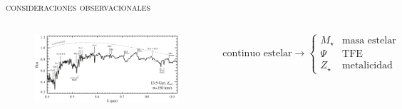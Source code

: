 \documentclass[xcolor=dvipsnames,4pt,fleqn,hyperref={colorlinks,citecolor=black,linkcolor=black,urlcolor=black}]{beamer}
\begin{document}
\begin{frame}{\textsc{consideraciones observacionales}}

\begin{columns}


\begin{figure}
\includegraphics[scale=0.33]{img/conroy2014-1}
\end{figure}

\begin{equation*}
\text{continuo estelar}\longrightarrow
\begin{cases}
M_\star & \text{masa estelar} \\
\Psi    & \text{TFE}          \\
Z_\star & \text{metalicidad}
\end{cases}
\end{equation*}
\end{columns}


\end{frame}
\end{document}
